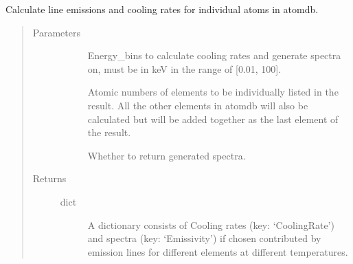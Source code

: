 \documentclass[letterpaper,10pt,english]{sphinxmanual}
\begin{document}
\begin{fulllineitems}
\label{\detokenize{prepare_pyatomdb:modules.prepare_pyatomdb.calculate_line_emission}}
Calculate line emissions and cooling rates for 
individual atoms in atomdb.
\begin{quote}\begin{description}
\item[{Parameters}] \leavevmode\begin{description}
\item[{}] \leavevmode
Energy\_bins to calculate cooling rates and 
generate spectra on, must be in keV in the 
range of {[}0.01, 100{]}.

\item[{}] \leavevmode
Atomic numbers of elements to be individually 
listed in the result. All the other elements 
in atomdb will also be calculated but will be 
added together as the last element of the result.

\item[{}] \leavevmode
Whether to return generated spectra.

\end{description}

\item[{Returns}] \leavevmode\begin{description}
\item[{dict}] \leavevmode
A dictionary consists of Cooling rates (key: ‘CoolingRate’) 
and spectra (key: ‘Emissivity’) if chosen contributed by emission 
lines for different elements at different temperatures.

\end{description}

\end{description}\end{quote}

\end{fulllineitems}

\end{document}
